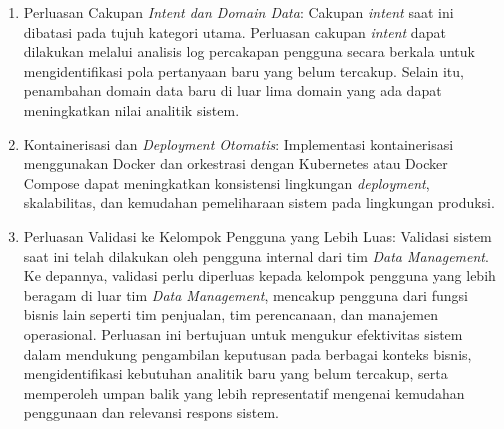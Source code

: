 \begin{enumerate}
  \item Perluasan Cakupan \textit{Intent dan Domain Data}: Cakupan \textit{intent} saat ini dibatasi pada tujuh kategori utama. Perluasan cakupan \textit{intent} dapat dilakukan melalui analisis log percakapan pengguna secara berkala untuk mengidentifikasi pola pertanyaan baru yang belum tercakup. Selain itu, penambahan domain data baru di luar lima domain yang ada dapat meningkatkan nilai analitik sistem.

  \item Kontainerisasi dan \textit{Deployment Otomatis}: Implementasi kontainerisasi meng\-gu\-na\-kan Docker dan orkestrasi dengan Kubernetes atau Docker Compose dapat meningkatkan konsistensi lingkungan \textit{deployment}, skalabilitas, dan kemudahan pemeliharaan sistem pada lingkungan produksi.

  \item Perluasan Validasi ke Kelompok Pengguna yang Lebih Luas: Validasi sistem saat ini telah dilakukan oleh pengguna internal dari tim \textit{Data Management}. Ke depannya, validasi perlu diperluas kepada kelompok pengguna yang lebih beragam di luar tim \textit{Data Management}, mencakup pengguna dari fungsi bisnis lain seperti tim penjualan, tim perencanaan, dan manajemen operasional. Perluasan ini bertujuan untuk mengukur efektivitas sistem dalam mendukung pengambilan keputusan pada berbagai konteks bisnis, mengidentifikasi kebutuhan analitik baru yang belum tercakup, serta memperoleh umpan balik yang lebih representatif mengenai kemudahan penggunaan dan relevansi respons sistem.
\end{enumerate}

